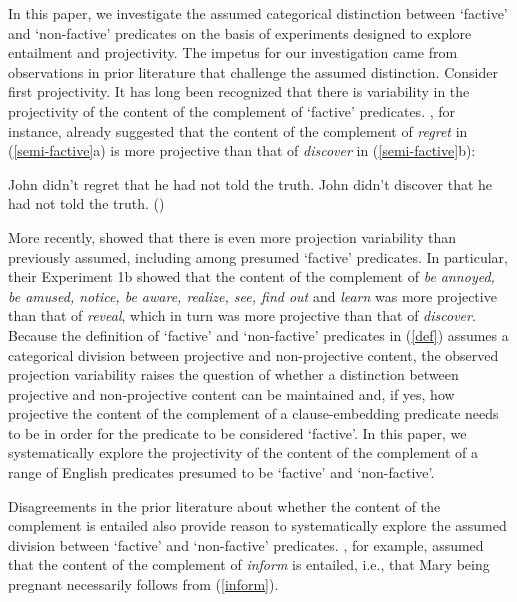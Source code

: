 \documentclass[11pt,fleqn]{article}
\newcommand{\6}{\mbox{$[\hspace*{-.6mm}[$}}
\newcommand{\9}{\mbox{$]\hspace*{-.6mm}]$}}
\begin{document}
In this paper, we investigate the assumed categorical distinction between `factive' and `non-factive' predicates on the basis of experiments designed to explore entailment and projectivity. The impetus for our investigation came from observations in prior literature that challenge the assumed distinction. Consider first projectivity. It has long been recognized that there is variability in the projectivity of the content of the complement of `factive' predicates. \citet{karttunen71b}, for instance, already suggested that the content of the complement of {\em regret} in (\ref{semi-factive}a) is more projective than that of {\em discover} in (\ref{semi-factive}b): 


\begin{exe}
\ex\label{semi-factive}
\begin{xlist}
\ex John didn't regret that he had not told the truth.
\ex John didn't discover that he had not told the truth.  
\hfill (\citealt[63]{karttunen71b})

\end{xlist}
\end{exe}
More recently, \citet*{tbd-variability} showed that there is even more projection variability than previously assumed, including among presumed `factive' predicates. In particular, their Experiment 1b showed that the content of the complement of {\em be annoyed, be amused, notice, be aware, realize, see, find out} and {\em learn} was more projective than that of {\em reveal}, which in turn was more projective than that of {\em discover}.  Because the definition of `factive' and `non-factive' predicates in (\ref{def}) assumes a categorical division between projective and non-projective content, the observed projection variability raises the question of whether a distinction between projective and non-projective content can be maintained and, if yes, how projective the content of the complement of a clause-embedding predicate needs to be in order for the predicate to be considered `factive'. In this paper, we systematically explore the projectivity of the content of the complement of a range of English predicates presumed to be `factive' and `non-factive'. 

Disagreements in the prior literature about whether the content of the complement is entailed also provide reason to systematically explore the assumed division between `factive'  and `non-factive' predicates. \citet[139]{schlenker10}, for example, assumed that the content of the complement of {\em inform} is entailed, i.e., that Mary being pregnant necessarily follows from (\ref{inform}).  
\end{document}
